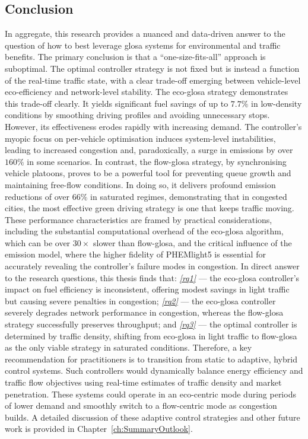 \subsection*{Conclusion}
In aggregate, this research provides a nuanced and data-driven answer to the question of how to best leverage \ac{glosa} systems for environmental and traffic benefits. The primary conclusion is that a \enquote{one-size-fits-all} approach is suboptimal. The optimal controller strategy is not fixed but is instead a function of the real-time traffic state, with a clear trade-off emerging between vehicle-level eco-efficiency and network-level stability.
\mynewline
The \ac{eco-glosa} strategy demonstrates this trade-off clearly. It yields significant fuel savings of up to $7.7\%$ in low-density conditions by smoothing driving profiles and avoiding unnecessary stops. However, its effectiveness erodes rapidly with increasing demand. The controller's myopic focus on per-vehicle optimisation induces system-level instabilities, leading to increased congestion and, paradoxically, a surge in emissions by over $160\%$ in some scenarios. In contrast, the \ac{flow-glosa} strategy, by synchronising vehicle platoons, proves to be a powerful tool for preventing queue growth and maintaining free-flow conditions. In doing so, it delivers profound emission reductions of over $66\%$ in saturated regimes, demonstrating that in congested cities, the most effective green driving strategy is one that keeps traffic moving. These performance characteristics are framed by practical considerations, including the substantial computational overhead of the \ac{eco-glosa} algorithm, which can be over $30\times$ slower than \ac{flow-glosa}, and the critical influence of the emission model, where the higher fidelity of PHEMlight5 is essential for accurately revealing the controller's failure modes in congestion.
\mynewline
In direct answer to the research questions, this thesis finds that: \textit{\vref{rq1}} --- the \ac{eco-glosa} controller's impact on fuel efficiency is inconsistent, offering modest savings in light traffic but causing severe penalties in congestion; \textit{\vref{rq2}} --- the \ac{eco-glosa} controller severely degrades network performance in congestion, whereas the \ac{flow-glosa} strategy successfully preserves throughput; and \textit{\vref{rq3}} --- the optimal controller is determined by traffic density, shifting from \ac{eco-glosa} in light traffic to \ac{flow-glosa} as the only viable strategy in saturated conditions.
\mynewline
Therefore, a key recommendation for practitioners is to transition from static to adaptive, hybrid control systems. Such controllers would dynamically balance energy efficiency and traffic flow objectives using real-time estimates of traffic density and market penetration. These systems could operate in an eco-centric mode during periods of lower demand and smoothly switch to a flow-centric mode as congestion builds. A detailed discussion of these adaptive control strategies and other future work is provided in Chapter~\vref{ch:SummaryOutlook}.